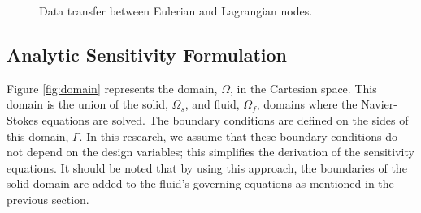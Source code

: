 \documentclass[12pt]{aiaa-pretty}
\begin{document}
%
\begin{figure}[H]
	\centering
	\quad
	\quad
	\caption{Data transfer between Eulerian and Lagrangian nodes.}
	\label{fig:mappingDataE2L}
\end{figure}
%

\subsection{Analytic Sensitivity Formulation}
Figure \ref{fig:domain} represents the domain, $\Omega$, in the Cartesian space. This domain is the union of the solid, $\Omega_s$, and fluid, $\Omega_f$, domains where the Navier-Stokes equations are solved. The boundary conditions are defined on the sides of this domain, $\Gamma$. In this research, we assume that these boundary conditions do not depend on the design variables; this simplifies the derivation of the sensitivity equations. It should be noted that by using this approach, the boundaries of the solid domain are added to the fluid's governing equations as mentioned in the previous section.
\end{document}
